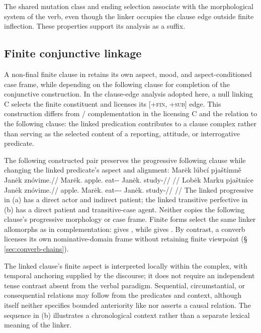 \noindent The shared mutation class and ending selection associate
 with the morphological system of the verb, even though the linker
occupies the clause edge outside finite inflection. These properties support its
analysis as a suffix.


\subsection{Finite conjunctive linkage}
\label{sec:finite-conjunctive-linkage}

A non-final finite clause in  retains its own aspect, mood, and
aspect-conditioned case frame, while depending on the following clause for
completion of the conjunctive construction. In the clause-edge analysis
adopted here, a null linking C selects the finite constituent and licenses
its \textsc{[+fin, +sub]} edge. This construction differs from
/ complementation in the licensing C and the relation to the
following clause: the linked predication contributes to a clause complex
rather than serving as the selected content of a reporting, attitude, or
interrogative predicate.

The following constructed pair preserves the progressive following clause
while changing the linked predicate's aspect and alignment:
\pex\label{ex:finite-linking-alignment}%
\a
\begingl
\gla Marėk lúbcí pjaštímně Janėk znóvime.//
\glb Marėk.\Dir{} apple.\Ind{} eat-\Prog{}-\Lnk{} Janėk.\Dir{} study-\Prog{}//
\glft {}//
\endgl
\a
\begingl
\gla Lobėk Marku pjaštníce Janėk znóvime.//
\glb apple.\Dir{} Marėk.\Trs{} eat-\Trs{}-\Pf{}-\Lnk{} Janėk.\Dir{} study-\Prog{}//
\glft {}
//
\endgl
\xe
The linked progressive in (a) has a direct actor and indirect patient; the
linked transitive perfective in (b) has a direct patient and transitive-case
agent. Neither copies the following clause's progressive morphology or case
frame. Finite forms select the same linker allomorphs as in complementation:
 gives , while  gives
. By contrast, a converb licenses its own nominative-domain
frame without retaining finite viewpoint (§\,\ref{sec:converb-chains}).

The linked clause's finite aspect is interpreted locally within the complex,
with temporal anchoring supplied by the discourse; it does not require an
independent tense contrast absent from the verbal paradigm. Sequential,
circumstantial, or consequential relations may follow from the predicates and
context, although  itself neither specifies bounded anteriority like
 nor asserts a causal relation. The sequence in (b) illustrates a
chronological context rather than a separate lexical meaning of the linker.

